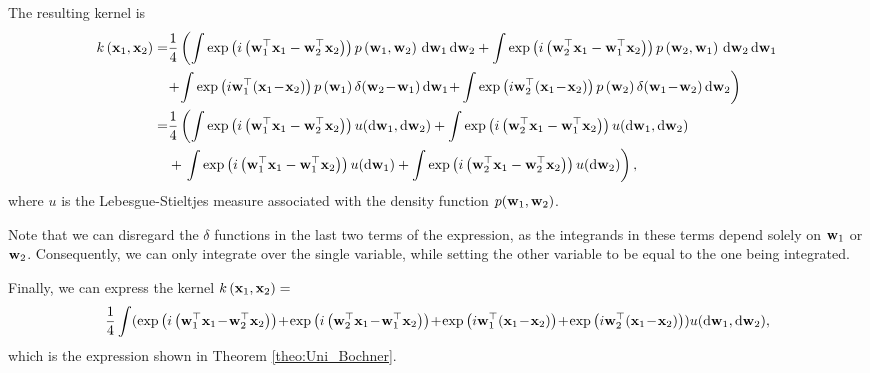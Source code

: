 The resulting kernel is 
\begin{equation}
\begin{aligned}
k\left(\x_1, \x_2\right) = &\frac{1}{4} \left( \int \exp\left(i\left(\w_1^{\top} \x_1 - \w_2^{\top} \x_2\right)\right) p\left(\w_1, \w_2\right) \, \mathrm{d} \w_1 \, \mathrm{d} \w_2 + \int \exp\left(i\left(\w_2^{\top} \x_1 - \w_1^{\top} \x_2\right)\right) p\left(\w_2, \w_1\right) \, \mathrm{d} \w_2 \, \mathrm{d} \w_1  \right. \\
& \! + \! \int \exp\left(i\w_1^{\top}( \x_1\! -\! \x_2)\right) p\left(\w_1\right)\delta(\w_2\! -\! \w_1) \, \mathrm{d} \w_1  \! +\!  \left. \int \exp\left(i\w_2^{\top}(\x_1 \! -\! \x_2)\right) p\left(\w_2\right)\delta(\w_1\! -\! \w_2) \, \mathrm{d} \w_2 \right) \\
= & \frac{1}{4} \left( \int \exp\left(i\left(\w_1^{\top} \x_1 - \w_2^{\top} \x_2\right)\right) u(\mathrm{d}\w_1, \mathrm{d}\w_2)  + \int \exp\left(i\left(\w_2^{\top} \x_1 - \w_1^{\top} \x_2\right)\right) u(\mathrm{d}\w_1, \mathrm{d}\w_2)   \right. \\
& + \left. \int \exp\left(i\left(\w_1^{\top} \x_1 - \w_1^{\top} \x_2\right)\right) u(\mathrm{d}\w_1)  + \int \exp\left(i\left(\w_2^{\top} \x_1 - \w_2^{\top} \x_2\right)\right) u(\mathrm{d}\w_2)  \right),
\end{aligned}
\end{equation}
where \( u \) is the Lebesgue-Stieltjes measure associated with the density function \( p({\mathbf w}_1, {\mathbf w}_2) \).

Note that we can disregard the $\delta$ functions in the last two terms of the expression, as the integrands in these terms depend solely on ${\mathbf w}_1$ or ${\mathbf w}_2$. Consequently, we can only integrate over the single variable, while setting the other variable to be equal to the one being integrated.

Finally, we can express the kernel $k\left({\mathbf x}_1, {\mathbf x}_2\right)=$
\begin{equation}
\begin{aligned}
\frac{1}{4} \int( \exp\left(i\left(\w_1^{\top} \x_1 \!-\! \w_2^{\top} \x_2\right)\right) \!+\! \exp\left(i\left(\w_2^{\top} \x_1 \!-\! \w_1^{\top} \x_2\right)\right) \!+\! \exp\left(i\w_1^{\top} (\x_1 \!-\! \x_2)\right) \!+\! \exp\left(i\w_2^{\top} (\x_1 \!-\! \x_2)\right)) u(\mathrm{d}\w_1, \mathrm{d}\w_2),
\end{aligned}
\end{equation}
which is the expression shown in Theorem \ref{theo:Uni_Bochner}. 

